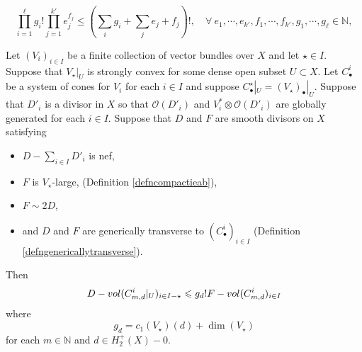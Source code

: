 \documentclass[10pt,a4paper]{amsart}
\newcommand{\Vol}{\textnormal{-vol}}
\newcommand{\bN}{\mathbb{N}}
\newcommand{\bP}{\mathbb{P}}
\newcommand{\calO}{\mathcal{O}}
\renewcommand{\leq}{\leqslant}
\begin{document}
	\begin{equation} \label{eqnreallreallyterribleinequality}
		\prod_{i=1}^{\ell} g_i! \prod_{j = 1}^{k'} e_j^{f_j} \leq (\sum_i g_i + \sum_j e_j+f_j)!, \quad \forall \ e_1,\cdots,e_{k'},f_1,\cdots,f_{k'}, g_1,\cdots,g_\ell \in \bN,
	\end{equation}

\begin{prop} \label{propboundsforsummands}
	Let $(V_i)_{i \in I}$ be a finite collection of vector bundles over $X$ and let $\star \in I$.
	Suppose that $V_\star|_U$ is strongly convex for some dense open subset $U \subset X$.
	Let $C^i_\bullet$ be a system of cones for $V_i$ for each $i \in I$ and suppose
	$C^\star_\bullet|_U = (V_\star)_\bullet|_U$.
	Suppose that $D'_i$ is a divisor in $X$ so that $\calO(D'_i)$ and $V_i^* \otimes \calO(D'_i)$ are globally generated for each $i \in I$.
	Suppose that $D$ and $F$ are smooth divisors on $X$ satisfying
	\begin{itemize}
		\item $D - \sum_{i \in I}D'_i$ is nef,
		\item
		      $F$ is $V_\star$-large,
		      (Definition \ref{defncompactieab}),
		\item $F \sim 2D$,
		\item and $D$ and $F$
		      are generically transverse to $(C^i_\bullet)_{i \in I}$ (Definition \ref{defngenericallytransverse}).
	\end{itemize}
	Then
	\begin{equation}
		D\Vol(C^i_{m,d}|_U)_{i \in I-\star} \leq g_d!F\Vol(C^i_{m,d})_{i \in I}
	\end{equation}
	where
	\begin{equation}
		g_d =
		c_1(V_\star)(d) + \dim(V_\star)
	\end{equation}
	for each $m \in \bN$ and $d \in H_2^+(X)-0$.
\end{prop}
\end{document}
